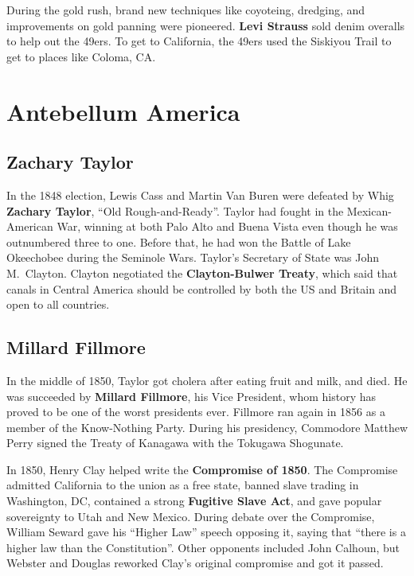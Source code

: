 During the gold rush, brand new techniques like coyoteing, dredging, and improvements on gold panning were pioneered.
\textbf{Levi Strauss} sold denim overalls to help out the 49ers.
To get to California, the 49ers used the Siskiyou Trail to get to places like Coloma, CA\@.

\section{Antebellum America}

\subsection*{Zachary Taylor}

In the 1848 election,
Lewis Cass and Martin Van Buren were defeated by Whig \textbf{Zachary Taylor}, ``Old Rough-and-Ready''.
Taylor had fought in the Mexican-American War,
winning at both Palo Alto and Buena Vista even though he was outnumbered three to one.
Before that, he had won the Battle of Lake Okeechobee during the Seminole Wars.
Taylor's Secretary of State was John M.\ Clayton.
Clayton negotiated the \textbf{Clayton-Bulwer Treaty},
which said that canals in Central America should be controlled by both the US and Britain and open to all countries.

\subsection*{Millard Fillmore}

In the middle of 1850, Taylor got cholera after eating fruit and milk, and died.
He was succeeded by \textbf{Millard Fillmore}, his Vice President,
whom history has proved to be one of the worst presidents ever.
Fillmore ran again in 1856 as a member of the Know-Nothing Party.
During his presidency, Commodore Matthew Perry signed the Treaty of Kanagawa with the Tokugawa Shogunate.

In 1850, Henry Clay helped write the \textbf{Compromise of 1850}.
The Compromise admitted California to the union as a free state,
banned slave trading in Washington, DC,
contained a strong \textbf{Fugitive Slave Act},
and gave popular sovereignty to Utah and New Mexico.
During debate over the Compromise, William Seward gave his ``Higher Law'' speech opposing it,
saying that ``there is a higher law than the Constitution''.
Other opponents included John Calhoun, but Webster and Douglas reworked Clay's original compromise and got it passed.

